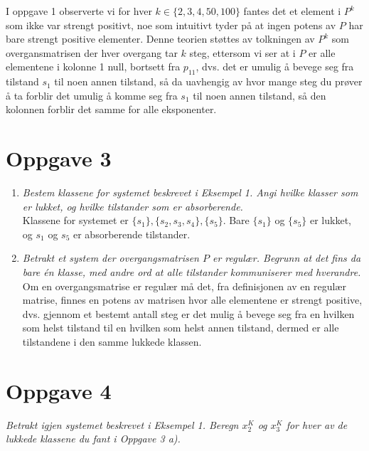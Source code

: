 \documentclass{article}[norsk]
\begin{document}
I oppgave 1 observerte vi for hver $k \in \{2,3,4,50,100\}$ fantes det et element i $P^k$ som ikke var strengt positivt, noe som intuitivt tyder på at ingen potens av $P$ har bare strengt positive elementer. Denne teorien støttes av tolkningen av $P^k$ som overgansmatrisen der hver overgang tar $k$ steg, ettersom vi ser at i $P$ er alle elementene i kolonne 1 null, bortsett fra $p_{11}$, dvs. det er umulig å bevege seg fra tilstand $s_1$ til noen annen tilstand, så da uavhengig av hvor mange steg du prøver å ta forblir det umulig å komme seg fra $s_1$ til noen annen tilstand, så den kolonnen forblir det samme for alle eksponenter.

\section*{Oppgave 3}
\begin{enumerate}[label=\alph*)]
    \item \textit{Bestem klassene for systemet beskrevet i Eksempel 1. Angi hvilke klasser som er lukket, og hvilke tilstander som er absorberende.}\\
    
    Klassene for systemet er $\{s_1\}, \{s_2,s_3,s_4\},\{s_5\}$. Bare $\{s_1\}$ og $\{s_5\}$ er lukket, og $s_1$ og $s_5$ er absorberende tilstander.
    \item \textit{Betrakt et system der overgangsmatrisen $P$ er regulær. Begrunn at det fins da bare én klasse, med andre ord at alle tilstander kommuniserer med hverandre.}\\
    
    Om en overgangsmatrise er regulær må det, fra definisjonen av en regulær matrise, finnes en potens av matrisen hvor alle elementene er strengt positive, dvs. gjennom et bestemt antall steg er det mulig å bevege seg fra en hvilken som helst tilstand til en hvilken som helst annen tilstand, dermed er alle tilstandene i den samme lukkede klassen.
\end{enumerate}

\section*{Oppgave 4}
\textit{Betrakt igjen systemet beskrevet i Eksempel 1. Beregn $x_2^K$ og $x_3^K$ for hver av de lukkede klassene du fant i Oppgave 3 a).}\\
\end{document}
